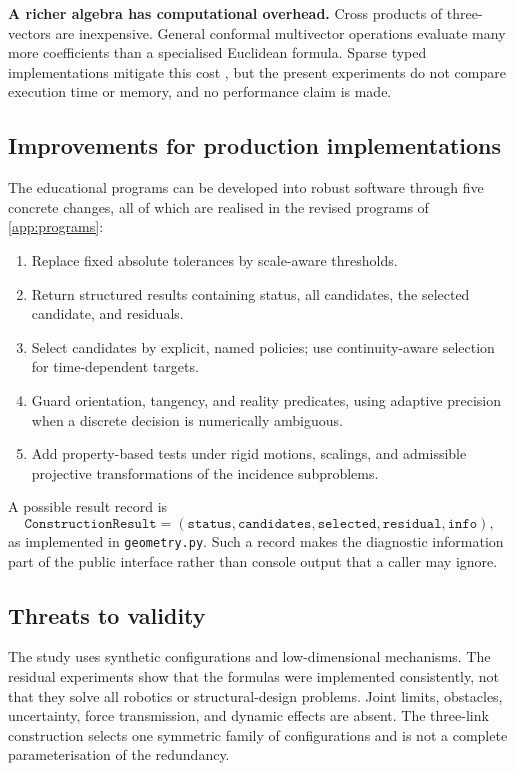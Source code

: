\documentclass[11pt,a4paper]{article}
\theoremstyle{plain}
\theoremstyle{definition}
\theoremstyle{remark}
\begin{document}
\textbf{A richer algebra has computational overhead.} Cross products of
three-vectors are inexpensive. General conformal multivector operations evaluate
many more coefficients than a specialised Euclidean formula. Sparse typed
implementations mitigate this cost \citep{hildenbrand2013,low2023}, but the
present experiments do not compare execution time or memory, and no performance
claim is made.

\subsection{Improvements for production implementations}

The educational programs can be developed into robust software through five
concrete changes, all of which are realised in the revised programs of
\cref{app:programs}:
\begin{enumerate}
  \item Replace fixed absolute tolerances by scale-aware thresholds.
  \item Return structured results containing status, all candidates, the
        selected candidate, and residuals.
  \item Select candidates by explicit, named policies; use continuity-aware
        selection for time-dependent targets.
  \item Guard orientation, tangency, and reality predicates, using adaptive
        precision when a discrete decision is numerically ambiguous.
  \item Add property-based tests under rigid motions, scalings, and admissible
        projective transformations of the incidence subproblems.
\end{enumerate}
A possible result record is
\begin{equation}
  \texttt{ConstructionResult}
  = (\texttt{status},\texttt{candidates},\texttt{selected},
     \texttt{residual},\texttt{info}),
\end{equation}
as implemented in \texttt{geometry.py}. Such a record makes the diagnostic
information part of the public interface rather than console output that a
caller may ignore.

\subsection{Threats to validity}

The study uses synthetic configurations and low-dimensional mechanisms. The
residual experiments show that the formulas were implemented consistently, not
that they solve all robotics or structural-design problems. Joint limits,
obstacles, uncertainty, force transmission, and dynamic effects are absent.
The three-link construction selects one symmetric family of configurations and
is not a complete parameterisation of the redundancy.
\end{document}
